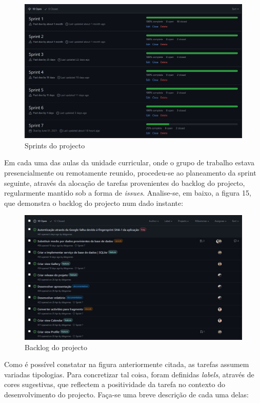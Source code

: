 \documentclass[12pt]{report}
\begin{document}
\bigskip
\begin{figure}[H]
    \centering
    \includegraphics[width=1\textwidth]{sprints.png}
    \caption{Sprints do projecto}
\end{figure}

Em cada uma das aulas da unidade curricular, onde o grupo de trabalho estava presencialmente ou remotamente reunido, procedeu-se ao planeamento da \gls{sprint} seguinte, através da alocação de tarefas provenientes do \gls{backlog} do projecto, regularmente mantido sob a forma de \textit{issues}. Analise-se, em baixo, a figura 15, que demonstra o \gls{backlog} do projecto num dado instante:

\bigskip
\begin{figure}[H]
    \centering
    \includegraphics[width=1\textwidth]{backlog.png}
    \caption{Backlog do projecto}
\end{figure}

Como é possível constatar na figura anteriormente citada, as tarefas assumem variadas tipologias. Para concretizar tal coisa, foram definidas \textit{labels}, através de cores sugestivas, que reflectem a positividade da tarefa no contexto do desenvolvimento do projecto. Faça-se uma breve descrição de cada uma delas:
\end{document}
